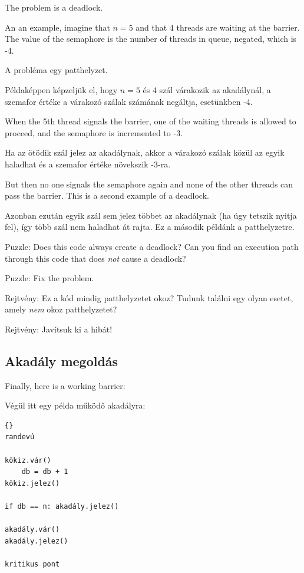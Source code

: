 \documentclass{book}
\newcommand{\clearemptydoublepage}{\newpage\cleardoublepage}
\begin{document}
The problem is a deadlock.

An an example, imagine that $n=5$
and that 4 threads are waiting at the barrier.  The value
of the semaphore is the number of threads in queue, negated, 
which is -4.

A probléma egy patthelyzet.

Példaképpen képzeljük el, hogy $n=5$ és 4 szál várakozik az
akadálynál, a szemafor értéke a várakozó szálak számának negáltja, esetünkben -4.


When the 5th thread signals the barrier, one of the waiting
threads is allowed to proceed, and the semaphore is incremented
to -3.

Ha az ötödik szál jelez az akadálynak, akkor a várakozó szálak közül az egyik
haladhat és a szemafor értéke növekszik -3-ra.

But then no one signals the semaphore again and none of the
other threads can pass the barrier.
This is a second example of a deadlock.

Azonban ezután egyik szál sem jelez többet az akadálynak (ha úgy tetszik nyitja
fel), így több szál nem haladhat át rajta. Ez a második példánk a patthelyzetre.

Puzzle: Does this code always create a deadlock?  Can you find an
execution path through this code that does {\em not} cause a deadlock?

Puzzle: Fix the problem.



Rejtvény: Ez a kód mindig patthelyzetet okoz? Tudunk találni egy olyan esetet,
amely {\em nem} okoz patthelyzetet?

Rejtvény: Javítsuk ki a hibát!

\clearemptydoublepage
\subsection{Akadály megoldás}
\label{barrier}

Finally, here is a working barrier:

Végül itt egy példa működő akadályra:

\begin{lstlisting}[title={Akadály megoldás}]{}
randevú

kökiz.vár()
    db = db + 1
kökiz.jelez()

if db == n: akadály.jelez()

akadály.vár()
akadály.jelez()

kritikus pont
\end{lstlisting}
\end{document}
